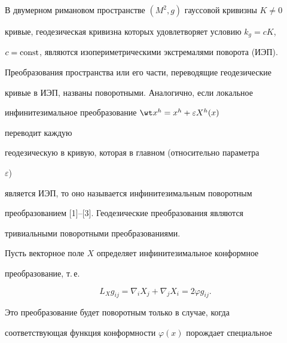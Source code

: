 

\pagestyle{plain} %


 




\maketitle 


\label{begin} 


 


В двумерном римановом пространстве $(M^2,g)$ гауссовой кривизны $K\ne0$ 


кривые, геодезическая кривизна которых удовлетворяет условию $k_g=c{}K$, 


$c=\operatorname{const}$, являются изопериметрическими экстремалями поворота (ИЭП). 


Преобразования пространства или его части, переводящие геодезические 


кривые в ИЭП, названы поворотными. Аналогично, если локальное 


инфинитезимальное преобразование $\wt x^h=x^h+\varepsilon X^h(x)$ 


переводит каждую 


геодезическую в кривую, которая в главном (относительно параметра


$\varepsilon$) 


является ИЭП, то оно называется инфинитезимальным поворотным 


преобразованием [1]--[3]. Геодезические преобразования являются 


тривиальными поворотными преобразованиями. 


 


Пусть векторное поле $X$ определяет инфинитезимальное конформное 


преобразование, т.\,е.


\begin{equation} 


L_X g_{ij}=\nabla_i X_j+\nabla_j X_i=2\varphi g_{ij}. 


\end{equation} 


Это преобразование будет поворотным только в случае, когда 


соответствующая функция конформности $\varphi(x)$ порождает специальное 


